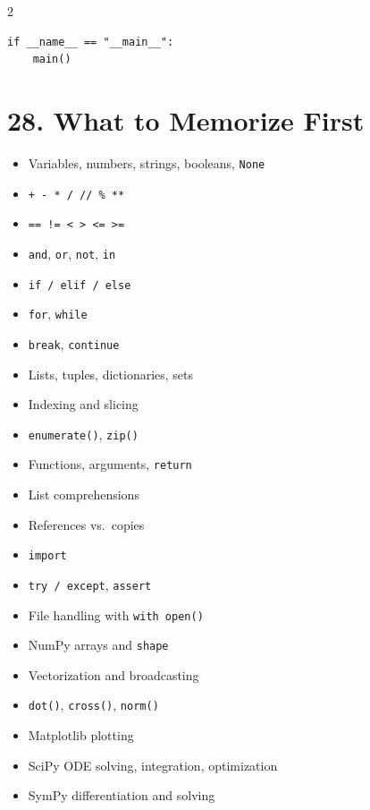 \documentclass[10pt,a4paper]{article}
\begin{document}
\begin{multicols}{2}
\begin{card}
\begin{lstlisting}[style=pythonstyle]
if __name__ == "__main__":
    main()
\end{lstlisting}
\end{card}

\section*{28. What to Memorize First}

\begin{card}
\begin{itemize}[leftmargin=*,nosep]
    \item Variables, numbers, strings, booleans, \texttt{None}
    \item \texttt{+ - * / // \% **}
    \item \texttt{== != < > <= >=}
    \item \texttt{and}, \texttt{or}, \texttt{not}, \texttt{in}
    \item \texttt{if / elif / else}
    \item \texttt{for}, \texttt{while}
    \item \texttt{break}, \texttt{continue}
    \item Lists, tuples, dictionaries, sets
    \item Indexing and slicing
    \item \texttt{enumerate()}, \texttt{zip()}
    \item Functions, arguments, \texttt{return}
    \item List comprehensions
    \item References vs.\ copies
    \item \texttt{import}
    \item \texttt{try / except}, \texttt{assert}
    \item File handling with \texttt{with open()}
    \item NumPy arrays and \texttt{shape}
    \item Vectorization and broadcasting
    \item \texttt{dot()}, \texttt{cross()}, \texttt{norm()}
    \item Matplotlib plotting
    \item SciPy ODE solving, integration, optimization
    \item SymPy differentiation and solving
\end{itemize}
\end{card}

\end{multicols}
\end{document}
